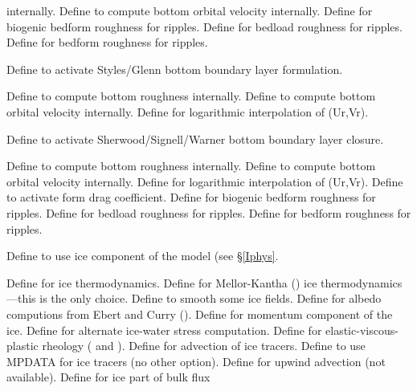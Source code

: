 \begin{klist}
\begin{klist}
\begin{klist}
      internally.
         Define to compute bottom orbital velocity
    internally.
         Define for biogenic bedform roughness for
    ripples.
         Define for bedload roughness for ripples.
         Define for bedform roughness for ripples.
      \end{klist}
       Define to activate Styles/Glenn bottom
   boundary layer formulation.
      \begin{klist}
         Define to compute bottom roughness
     internally.
         Define to compute bottom orbital velocity
    internally.
          Define for logarithmic interpolation of
     (Ur,Vr).
      \end{klist}
       Define to activate Sherwood/Signell/Warner bottom
    boundary layer closure.
      \begin{klist}
         Define to compute bottom roughness
     internally.
         Define to compute bottom orbital velocity
    internally.
          Define for logarithmic interpolation of
     (Ur,Vr).
         Define to activate form drag
     coefficient.
         Define for biogenic bedform roughness for
    ripples.
         Define for bedload roughness for ripples.
         Define for bedform roughness for ripples.
      \end{klist}
  \end{klist}
  Define to use ice component of the model (see
       \S\ref{Iphys}.
      \begin{klist}
         Define for ice thermodynamics.
         Define for Mellor-Kantha (\cite{Mellor89})
	ice thermodynamics---this is the only choice.
	 Define to smooth some ice fields.
	 Define for albedo computions from Ebert
	and Curry (\cite{Ebert93}).
	 Define for momentum component of the ice.
	 Define for alternate ice-water stress
	computation.
	 Define for elastic-viscous-plastic rheology
	(\cite{Hunke97} and \cite{Hunke_2001}).
	 Define for advection of ice tracers.
	 Define to use MPDATA for ice tracers (no
	other option).
	 Define for upwind advection (not available).
	 Define for ice part of bulk flux

\end{klist}
\end{klist}
